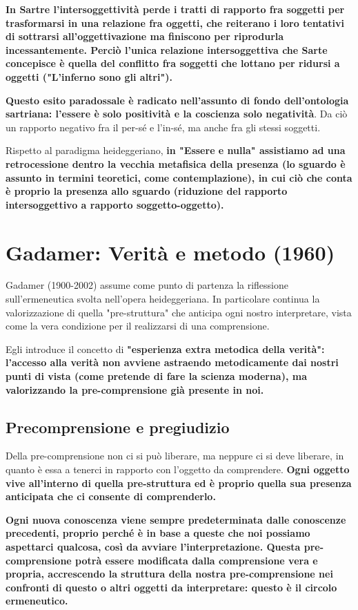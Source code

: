\textbf{In Sartre l'intersoggettività perde i tratti di rapporto fra soggetti per trasformarsi in una relazione fra oggetti, che reiterano i loro tentativi di sottrarsi all'oggettivazione ma finiscono per riprodurla incessantemente. Perciò l'unica relazione intersoggettiva che Sarte concepisce è quella del conflitto fra soggetti che lottano per ridursi a oggetti ("L’inferno sono gli altri").}

\textbf{Questo esito paradossale è radicato nell'assunto di fondo dell'ontologia sartriana: l'essere è solo positività e la coscienza solo negatività}. Da ciò un rapporto negativo fra il per-sé e l'in-sé, ma anche fra gli stessi soggetti.

Rispetto al paradigma heideggeriano, \textbf{in "Essere e nulla" assistiamo ad una retrocessione dentro la vecchia metafisica della presenza (lo sguardo è assunto in termini teoretici, come contemplazione), in cui ciò che conta è proprio la presenza allo sguardo (riduzione del rapporto intersoggettivo a rapporto soggetto-oggetto).}

\section{Gadamer: Verità e metodo (1960)}

Gadamer (1900-2002) assume come punto di partenza la
riflessione sull'ermeneutica svolta nell'opera
heideggeriana. In particolare continua la valorizzazione
di quella "pre-struttura" che anticipa ogni
nostro interpretare, vista come la vera condizione
per il realizzarsi di una comprensione.

Egli introduce il concetto di \textbf{"esperienza
extra metodica della verità": l'accesso alla verità
non avviene astraendo metodicamente dai nostri
punti di vista (come pretende di fare la scienza
moderna), ma valorizzando la pre-comprensione già
presente in noi.}

\subsection{Precomprensione e pregiudizio}

Della pre-comprensione non ci si può liberare, ma
neppure ci si deve liberare, in quanto è essa a
tenerci in rapporto con l'oggetto da comprendere.
\textbf{Ogni oggetto vive all'interno di quella pre-struttura
ed è proprio quella sua presenza anticipata che ci
consente di comprenderlo.}

\textbf{Ogni nuova conoscenza viene sempre predeterminata
dalle conoscenze precedenti, proprio perché è in base
a queste che noi possiamo aspettarci qualcosa, così da
avviare l'interpretazione. Questa pre-comprensione
potrà essere modificata dalla comprensione vera e propria,
accrescendo la struttura della nostra pre-comprensione
nei confronti di questo o altri oggetti da interpretare:
questo è il circolo ermeneutico.}

